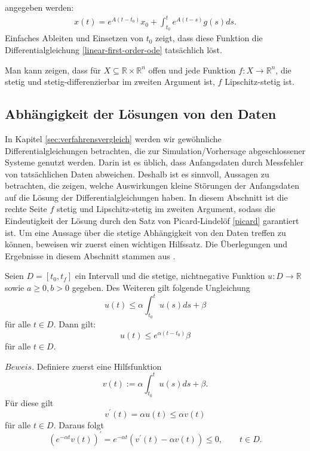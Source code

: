 \cite{Matrixexponential} angegeben werden:
\begin{align}
    \label{linear-ode-solution}
    x(t) = e^{A(t-t_0)}x_0 + \int_{t_0}^{t}e^{A(t-s)}g(s) ds.
\end{align}
Einfaches Ableiten und Einsetzen von $t_0$ zeigt, dass diese Funktion die Differentialgleichung
\eqref{linear-first-order-ode} tatsächlich löst.
\begin{bem}
    \label{f-lipschitz}
    Man kann zeigen, dass für $X\subseteq \mathbb{R}\times\mathbb{R}^n$ offen und jede Funktion
    $f:X \rightarrow \mathbb{R}^n$, die stetig und stetig-differenzierbar im zweiten Argument ist, $f$
    Lipschitz-stetig ist.
\end{bem}

\subsection{Abhängigkeit der Lösungen von den Daten}
In Kapitel \ref{sec:verfahrensvergleich} werden wir gewöhnliche Differentialgleichungen betrachten, die zur
Simulation/Vorhersage abgeschlossener Systeme genutzt werden. Darin ist es üblich, dass Anfangsdaten durch Messfehler
von tatsächlichen Daten abweichen. Deshalb ist es sinnvoll, Aussagen zu betrachten, die zeigen, welche Auswirkungen
kleine Störungen der Anfangsdaten auf die Lösung der Differentialgleichungen haben. In diesem Abschnitt ist die rechte
Seite $f$ stetig und Lipschitz-stetig im zweiten Argument, sodass die Eindeutigkeit der Lösung durch den Satz von
Picard-Lindelöf \ref{picard} garantiert ist. Um eine Aussage über die stetige Abhängigkeit von den Daten treffen zu
können, beweisen wir zuerst einen wichtigen Hilfssatz. Die Überlegungen und Ergebnisse in diesem Abschnitt stammen aus
\cite{beckGewohnlicheDifferentialgleichungen2018}.
\begin{theorem}
    \label{Satz-gronwall}
    Seien $D=[t_{0}, t_{f}]$ ein Intervall und die stetige, nichtnegative Funktion $u : D \rightarrow \mathbb{R}$
    sowie $a \geq 0, b > 0$ gegeben. Des Weiteren gilt folgende Ungleichung
    \[
        u(t) \leq \alpha \int_{t_{0}}^{t}u(s)ds + \beta
    \]
    für alle $t \in D$. Dann gilt:
    \[
        u(t) \leq e^{\alpha(t-t_{0})}\beta
    \]
    für alle $t \in D$.
\end{theorem}
$Beweis.$ Definiere zuerst eine Hilfsfunktion
\[
    v(t) := \alpha \int_{t_{0}}^{t} u(s)ds + \beta.
\] Für diese gilt
\[
    v^\prime(t) = \alpha u(t) \leq \alpha v(t)
\] für alle $t \in D$. Daraus folgt
\[
    (e^{-\alpha t}v(t))^\prime = e^{-\alpha t}(v^\prime(t)-\alpha v(t)) \leq 0, \qquad t \in D.
\]
